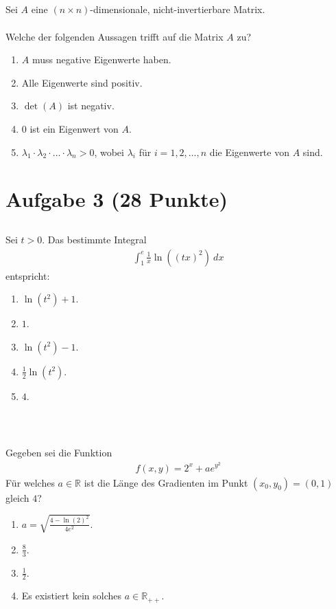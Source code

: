 \subsection*{}
Sei $A$ eine $(n \times n)$-dimensionale, nicht-invertierbare Matrix.\\
\\
Welche der folgenden Aussagen trifft auf die Matrix $A$ zu?
\renewcommand{\labelenumi}{(\alph{enumi})}
\begin{enumerate}
	\item 
	$A$ muss negative Eigenwerte haben.
	\item
	Alle Eigenwerte sind positiv.
	\item
	$\det(A)$ ist negativ.
	\item
	$0$ ist ein Eigenwert von $A$.
	\item 
	$\lambda_1 \cdot \lambda_2 \cdot \dots \cdot \lambda_n > 0 $, wobei $\lambda_i$ für $i = 1,2,\dots,n$ die Eigenwerte von $A$ sind.
\end{enumerate}

\newpage
\section*{Aufgabe 3 (28 Punkte)}
\vspace{0.4cm}

\subsection*{}
Sei $t > 0$. Das bestimmte Integral
\begin{align*}
	\int_1^e \frac{1}{x} \ln\left((tx)^2\right) \ dx
\end{align*}
entspricht:
\renewcommand{\labelenumi}{(\alph{enumi})}
\begin{enumerate}
\item 
$ \ln(t^2)  +1  $.
\item
$ 1 $.
\item
$ \ln(t^2) -1 $.
\item 
$\frac{1}{2} \ln(t^2)$.
\item $4$.
\end{enumerate}
\ \\
\subsection*{}
Gegeben sei die Funktion
\begin{align*}
	f(x,y) = 2^x +  a e^{y^2}
\end{align*}
Für welches $a \in \mathbb{R}$ ist die Länge des Gradienten im Punkt $(x_0,y_0) = (0,1)$ gleich $4$?
\renewcommand{\labelenumi}{(\alph{enumi})}
\begin{enumerate}
	\item 
	$a = \sqrt{\frac{4 - \ln(2)^2}{4 e^2}} $.
	\item
	$\frac{8}{3}$.
	\item
	$\frac{1}{2}$.
	\item
	Es existiert kein solches $ a \in \mathbb{R}_{++} $.
\end{enumerate}
\newpage
